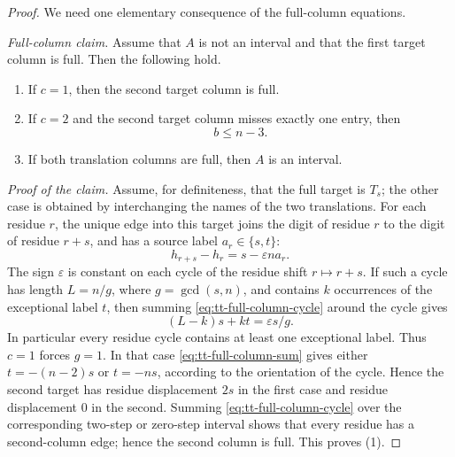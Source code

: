 \documentclass{amsart}
\theoremstyle{definition}
\theoremstyle{remark}
\begin{document}
\begin{proof}
We need one elementary consequence of the full-column equations.

\emph{Full-column claim.}  Assume that \(A\) is not an interval and
that the first target column is full.  Then the following hold.
\begin{enumerate}
\item If \(c=1\), then the second target column is full.
\item If \(c=2\) and the second target column misses exactly one entry,
then
\begin{equation}\label{eq:tt-low-count-bound}
  b\le n-3 .
\end{equation}
\item If both translation columns are full, then \(A\) is an interval.
\end{enumerate}

\emph{Proof of the claim.}  Assume, for definiteness, that the full
target is \(T_s\); the other case is obtained by interchanging the names
of the two translations.  For each residue \(r\), the unique edge into
this target joins the digit of residue \(r\) to the digit of residue
\(r+s\), and has a source label \(a_r\in\{s,t\}\):
\begin{equation}\label{eq:tt-full-column-cycle}
  h_{r+s}-h_r=s-\varepsilon n a_r .
\end{equation}
The sign \(\varepsilon\) is constant on each cycle of the residue shift
\(r\mapsto r+s\).  If such a cycle has length \(L=n/g\), where
\(g=\gcd(s,n)\), and contains \(k\) occurrences of the exceptional label
\(t\), then summing \eqref{eq:tt-full-column-cycle} around the cycle gives
\begin{equation}\label{eq:tt-full-column-sum}
  (L-k)s+kt=\varepsilon s/g .
\end{equation}
In particular every residue cycle contains at least one exceptional
label.  Thus \(c=1\) forces \(g=1\).  In that case
\eqref{eq:tt-full-column-sum} gives either \(t=-(n-2)s\) or \(t=-ns\),
according to the orientation of the cycle.  Hence the second target has
residue displacement \(2s\) in the first case and residue displacement
\(0\) in the second.  Summing \eqref{eq:tt-full-column-cycle} over the
corresponding two-step or zero-step interval shows that every residue
has a second-column edge; hence the second column is full.  This proves
(1).


\end{proof}
\end{document}
